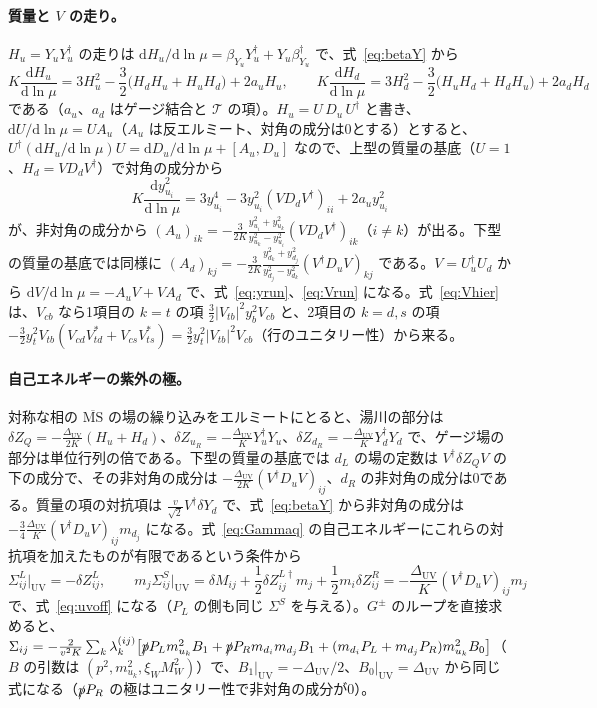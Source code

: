 \documentclass[a4paper,10pt]{ltjsarticle}
\newcommand{\dd}{\mathrm{d}}
\newcommand{\MSbar}{\overline{\mathrm{MS}}}
\newcommand{\DUV}{\Delta_{\mathrm{UV}}}
\begin{document}
\paragraph{質量と $V$ の走り。}$H_u=Y_uY_u^\dagger$ の走りは $\dd H_u/\dd\ln\mu=\beta_{Y_u}Y_u^\dagger+Y_u\beta_{Y_u}^\dagger$ で、式~\eqref{eq:betaY} から
\begin{equation*}
K\frac{\dd H_u}{\dd\ln\mu}=3H_u^2-\frac32\bigl(H_dH_u+H_uH_d\bigr)+2a_uH_u,\qquad
K\frac{\dd H_d}{\dd\ln\mu}=3H_d^2-\frac32\bigl(H_uH_d+H_dH_u\bigr)+2a_dH_d
\end{equation*}
である（$a_u$、$a_d$ はゲージ結合と $\mathcal T$ の項）。$H_u=U\,D_u\,U^\dagger$ と書き、$\dd U/\dd\ln\mu=UA_u$（$A_u$ は反エルミート、対角の成分は0とする）とすると、$U^\dagger(\dd H_u/\dd\ln\mu)U=\dd D_u/\dd\ln\mu+[A_u,D_u]$ なので、上型の質量の基底（$U=1$、$H_d=VD_dV^\dagger$）で対角の成分から
\begin{equation*}
K\frac{\dd y_{u_i}^2}{\dd\ln\mu}=3y_{u_i}^4-3y_{u_i}^2(VD_dV^\dagger)_{ii}+2a_uy_{u_i}^2
\end{equation*}
が、非対角の成分から $(A_u)_{ik}=-\frac3{2K}\frac{y_{u_i}^2+y_{u_k}^2}{y_{u_k}^2-y_{u_i}^2}(VD_dV^\dagger)_{ik}$（$i\ne k$）が出る。下型の質量の基底では同様に $(A_d)_{kj}=-\frac3{2K}\frac{y_{d_k}^2+y_{d_j}^2}{y_{d_j}^2-y_{d_k}^2}(V^\dagger D_uV)_{kj}$ である。$V=U_u^\dagger U_d$ から $\dd V/\dd\ln\mu=-A_uV+VA_d$ で、式~\eqref{eq:yrun}、\eqref{eq:Vrun} になる。式~\eqref{eq:Vhier} は、$V_{cb}$ なら1項目の $k=t$ の項 $\frac32|V_{tb}|^2y_b^2V_{cb}$ と、2項目の $k=d,s$ の項 $-\frac32y_t^2V_{tb}(V_{cd}V_{td}^*+V_{cs}V_{ts}^*)=\frac32y_t^2|V_{tb}|^2V_{cb}$（行のユニタリー性）から来る。

\paragraph{自己エネルギーの紫外の極。}対称な相の $\MSbar$ の場の繰り込みをエルミートにとると、湯川の部分は $\delta Z_Q=-\frac{\DUV}{2K}(H_u+H_d)$、$\delta Z_{u_R}=-\frac{\DUV}KY_u^\dagger Y_u$、$\delta Z_{d_R}=-\frac{\DUV}KY_d^\dagger Y_d$ で、ゲージ場の部分は単位行列の倍である。下型の質量の基底では $d_L$ の場の定数は $V^\dagger\delta Z_QV$ の下の成分で、その非対角の成分は $-\frac{\DUV}{2K}(V^\dagger D_uV)_{ij}$、$d_R$ の非対角の成分は0である。質量の項の対抗項は $\frac v{\sqrt2}V^\dagger\delta Y_d$ で、式~\eqref{eq:betaY} から非対角の成分は $-\frac34\frac{\DUV}K(V^\dagger D_uV)_{ij}m_{d_j}$ になる。式~\eqref{eq:Gammaq} の自己エネルギーにこれらの対抗項を加えたものが有限であるという条件から
\begin{equation*}
\Sigma^L_{ij}\big|_{\mathrm{UV}}=-\delta Z^L_{ij},\qquad
m_j\Sigma^S_{ij}\big|_{\mathrm{UV}}=\delta M_{ij}+\frac12\delta Z^{L\dagger}_{ij}m_j+\frac12m_i\delta Z^R_{ij}=-\frac{\DUV}K(V^\dagger D_uV)_{ij}m_j
\end{equation*}
で、式~\eqref{eq:uvoff} になる（$P_L$ の側も同じ $\Sigma^S$ を与える）。$G^\pm$ のループを直接求めると、$\Sigma_{ij}=-\frac2{v^2K}\sum_k\lambda^{(ij)}_k\bigl[\slashed pP_Lm_{u_k}^2B_1+\slashed pP_Rm_{d_i}m_{d_j}B_1+(m_{d_i}P_L+m_{d_j}P_R)m_{u_k}^2B_0\bigr]$（$B$ の引数は $(p^2,m_{u_k}^2,\xi_WM_W^2)$）で、$B_1|_{\mathrm{UV}}=-\DUV/2$、$B_0|_{\mathrm{UV}}=\DUV$ から同じ式になる（$\slashed pP_R$ の極はユニタリー性で非対角の成分が0）。
\end{document}
